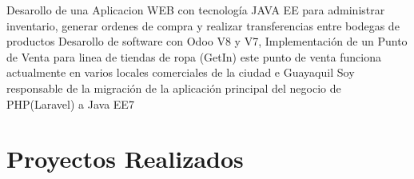 \documentclass[11pt,a4paper,sans]{moderncv}   %
\begin{document}
\iffalse
\newline{}%
Detalle de logros:%
\begin{itemize}%
\item Logro 1;
\item Logro 2, con sub-logros:
  \begin{itemize}%
  \item Sub-logro (a);
  \item Sub-logro (b), con sub-sub-logros (¡evite hacer esto!);
    \begin{itemize}
    \item Sub-sub-logro i;
    \item Sub-sub-logro ii;
    \item Sub-sub-logro iii;
    \end{itemize}
  \item Sub-logro (c);
  \end{itemize}
\item Logro 3.
\end{itemize}}
\fi
{}
{Desarollo de una Aplicacion WEB con tecnología JAVA EE para administrar inventario, generar ordenes de compra y realizar transferencias entre bodegas de productos \newline
}
{Desarollo de software con Odoo V8 y V7, Implementación de un Punto de Venta para linea de tiendas de ropa (GetIn) este punto de venta funciona actualmente en varios locales comerciales de la ciudad e Guayaquil}
{Soy responsable de la migración de la aplicación principal del negocio de PHP(Laravel) a Java EE7 }












\section{Proyectos Realizados}
\end{document}
